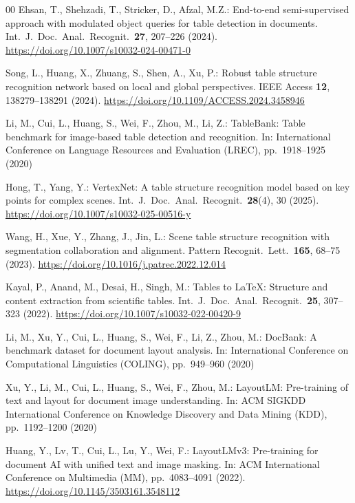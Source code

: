 \documentclass[pdflatex,sn-mathphys-num,iicol]{sn-jnl}
\begin{document}
\begin{thebibliography}{00}
Ehsan, T., Shehzadi, T., Stricker, D., Afzal, M.Z.:
End-to-end semi-supervised approach with modulated object queries for table
detection in documents.
Int.\ J.\ Doc.\ Anal.\ Recognit.\ \textbf{27}, 207--226 (2024).
\url{https://doi.org/10.1007/s10032-024-00471-0}

Song, L., Huang, X., Zhuang, S., Shen, A., Xu, P.:
Robust table structure recognition network based on local and global perspectives.
IEEE Access \textbf{12}, 138279--138291 (2024).
\url{https://doi.org/10.1109/ACCESS.2024.3458946}

Li, M., Cui, L., Huang, S., Wei, F., Zhou, M., Li, Z.:
TableBank: Table benchmark for image-based table detection and recognition.
In: International Conference on Language Resources and Evaluation (LREC),
pp.~1918--1925 (2020)

Hong, T., Yang, Y.:
VertexNet: A table structure recognition model based on key points for complex scenes.
Int.\ J.\ Doc.\ Anal.\ Recognit.\ \textbf{28}(4), 30 (2025).
\url{https://doi.org/10.1007/s10032-025-00516-y}

Wang, H., Xue, Y., Zhang, J., Jin, L.:
Scene table structure recognition with segmentation collaboration and alignment.
Pattern Recognit.\ Lett.\ \textbf{165}, 68--75 (2023).
\url{https://doi.org/10.1016/j.patrec.2022.12.014}

Kayal, P., Anand, M., Desai, H., Singh, M.:
Tables to LaTeX: Structure and content extraction from scientific tables.
Int.\ J.\ Doc.\ Anal.\ Recognit.\ \textbf{25}, 307--323 (2022).
\url{https://doi.org/10.1007/s10032-022-00420-9}

Li, M., Xu, Y., Cui, L., Huang, S., Wei, F., Li, Z., Zhou, M.:
DocBank: A benchmark dataset for document layout analysis.
In: International Conference on Computational Linguistics (COLING),
pp.~949--960 (2020)

Xu, Y., Li, M., Cui, L., Huang, S., Wei, F., Zhou, M.:
LayoutLM: Pre-training of text and layout for document image understanding.
In: ACM SIGKDD International Conference on Knowledge Discovery and Data Mining
(KDD), pp.~1192--1200 (2020)

Huang, Y., Lv, T., Cui, L., Lu, Y., Wei, F.:
LayoutLMv3: Pre-training for document AI with unified text and image masking.
In: ACM International Conference on Multimedia (MM), pp.~4083--4091 (2022).
\url{https://doi.org/10.1145/3503161.3548112}


\end{thebibliography}
\end{document}
